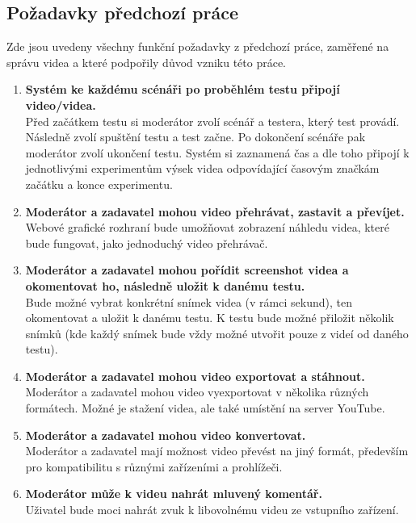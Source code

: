 \documentclass[thesis=M,czech]{FITthesis}[2012/06/26]
\begin{document}
\subsection{Požadavky předchozí práce} \label{subsec:analyza_predchozi_prace_pozadavky}
Zde jsou uvedeny všechny funkční požadavky z předchozí práce, zaměřené na správu videa a které podpořily důvod vzniku této práce.
\begin{enumerate}
	\item \textbf{Systém ke každému scénáři po proběhlém testu připojí video/videa.\\}
Před začátkem testu si moderátor zvolí scénář a testera, který test provádí. Následně zvolí spuštění testu a test začne. Po dokončení scénáře pak moderátor zvolí ukončení testu. Systém si zaznamená čas a dle toho připojí k jednotlivými experimentům výsek videa odpovídající časovým značkám začátku a konce experimentu.

	\item \textbf{Moderátor a zadavatel mohou video přehrávat, zastavit a převíjet.\\}
Webové grafické rozhraní bude umožňovat zobrazení náhledu videa, které bude fungovat, jako jednoduchý video přehrávač.

	\item \textbf{Moderátor a zadavatel mohou pořídit screenshot videa a okomentovat ho, následně uložit k danému testu.\\}
Bude možné vybrat konkrétní snímek videa (v rámci sekund), ten okomentovat a uložit k danému testu. K testu bude možné přiložit několik snímků (kde každý snímek bude vždy možné utvořit pouze z videí od daného testu).

	\item \textbf{Moderátor a zadavatel mohou video exportovat a stáhnout.\\}
Moderátor a zadavatel mohou video vyexportovat v několika různých formátech. Možné je stažení videa, ale také umístění na server YouTube.

	\item \textbf{Moderátor a zadavatel mohou video konvertovat.\\}
Moderátor a zadavatel mají možnost video převést na jiný formát, především pro kompatibilitu s různými zařízeními a prohlížeči.

	\item \textbf{Moderátor může k videu nahrát mluvený komentář.\\}
Uživatel bude moci nahrát zvuk k libovolnému videu ze vstupního zařízení.
\end{enumerate}
\end{document}
